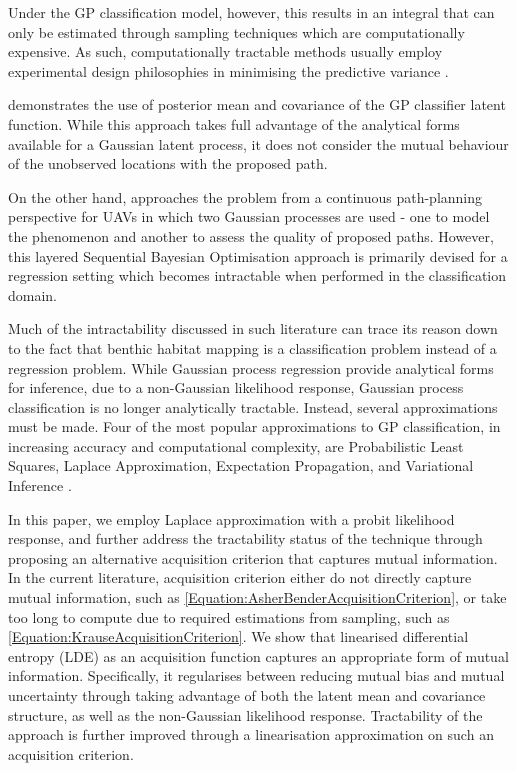 		Under the GP classification model, however, this results in an integral that can only be estimated through sampling techniques which are computationally expensive. As such, computationally tractable methods usually employ experimental design philosophies in minimising the predictive variance \citep{AsherBender}.
		
		\cite{Kapoor} demonstrates the use of posterior mean and covariance of the GP classifier latent function. While this approach takes full advantage of the analytical forms available for a Gaussian latent process, it does not consider the mutual behaviour of the unobserved locations with the proposed path.
		
		On the other hand, \cite{Roman:SequentialBayesianOptimisation} approaches the problem from a continuous path-planning perspective for UAVs in which two Gaussian processes are used - one to model the phenomenon and another to assess the quality of proposed paths. However, this layered Sequential Bayesian Optimisation approach is primarily devised for a regression setting which becomes intractable when performed in the classification domain.
		
		Much of the intractability discussed in such literature can trace its reason down to the fact that benthic habitat mapping is a classification problem instead of a regression problem. While Gaussian process regression provide analytical forms for inference, due to a non-Gaussian likelihood response, Gaussian process classification is no longer analytically tractable. Instead, several approximations must be made. Four of the most popular approximations to GP classification, in increasing accuracy and computational complexity, are Probabilistic Least Squares, Laplace Approximation, Expectation Propagation, and Variational Inference \citep{GaussianProcessForMachineLearning}.
		
		In this paper, we employ Laplace approximation with a probit likelihood response, and further address the tractability status of the technique through proposing an alternative acquisition criterion that captures mutual information. In the current literature, acquisition criterion either do not directly capture mutual information, such as \eqref{Equation:AsherBenderAcquisitionCriterion}, or take too long to compute due to required estimations from sampling, such as \eqref{Equation:KrauseAcquisitionCriterion}. We show that linearised differential entropy (LDE) as an acquisition function captures an appropriate form of mutual information. Specifically, it regularises between reducing mutual bias and mutual uncertainty through taking advantage of both the latent mean and covariance structure, as well as the non-Gaussian likelihood response. Tractability of the approach is further improved through a linearisation approximation on such an acquisition criterion.
		
